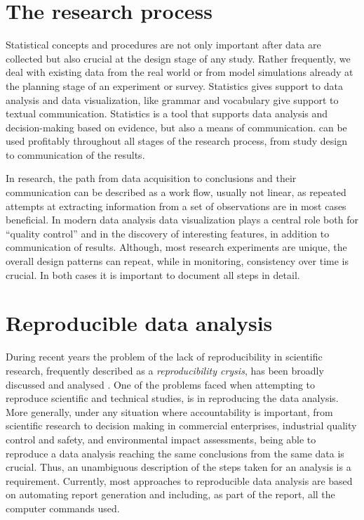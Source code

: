 \documentclass[krantz2]{krantz}\usepackage{knitr}
\begin{document}
\section{The research process}

Statistical concepts and procedures are not only important after data are collected but also crucial at the design stage of any study. Rather frequently, we deal with existing data from the real world or from model simulations already at the planning stage of an experiment or survey. Statistics gives support to data analysis and data visualization, like grammar and vocabulary give support to textual communication. Statistics is a tool that supports data analysis and decision-making based on evidence, but also a means of communication. \Rlang can be used profitably throughout all stages of the research process, from study design to communication of the results.

In research, the path from data acquisition to conclusions and their communication can be described as a work flow, usually not linear, as repeated attempts at extracting information from a set of observations are in most cases beneficial. In modern data analysis data visualization plays a central role both for ``quality control'' and in the discovery of interesting features, in addition to communication of results. Although, most research experiments are unique, the overall design patterns can repeat, while in monitoring, consistency over time is crucial. In both cases it is important to document all steps in detail.

\section{Reproducible data analysis}
During recent years the problem of the lack of reproducibility in scientific research, frequently described as a \emph{reproducibility crysis}, has been broadly discussed and analysed \autocite{Gandrud2015}. One of the problems faced when attempting to reproduce scientific and technical studies, is in reproducing the data analysis. More generally, under any situation where accountability is important, from scientific research to decision making in commercial enterprises, industrial quality control and safety, and environmental impact assessments, being able to reproduce a data analysis reaching the same conclusions from the same data is crucial. Thus, an unambiguous description of the steps taken for an analysis is a requirement. Currently, most approaches to reproducible data analysis are based on automating report generation and including, as part of the report, all the computer commands used.
\end{document}
